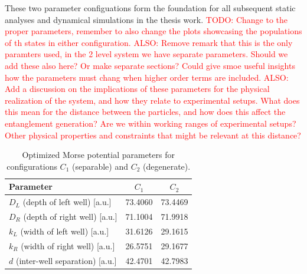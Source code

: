 \documentclass{subfiles}
\begin{document}
These two parameter configuations form the foundation for all subsequent static analyses and dynamical simulations in the thesis work. \textcolor{red}{TODO: Change to the proper parameters, remember to also change the plots showcasing the populations of th states in either configuration. ALSO: Remove remark that this is the only paramters used, in the 2 level system we have separate parameters. Should we add these also here? Or make separate sections? Could give smoe useful insights how the parameters must chang when higher order terms are included. ALSO: Add a discussion on the implications of these parameters for the physical realization of the system, and how they relate to experimental setups. What does this mean for the distance between the particles, and how does this affect the entanglement generation? Are we within working ranges of experimental setups? Other physical properties and constraints that might be relevant at this distance?}
\begin{table}[h!]
  \centering
  \caption{Optimized Morse potential parameters for configurations \(C_1\) (separable) and \(C_2\) (degenerate).}
  \label{tab:optimized_params}
  \begin{tabular}{lcc}
    \toprule
    Parameter & \(C_1\) & \(C_2\) \\
    \midrule
    \(D_L\) (depth of left well)       [a.u.] & 73.4060 & 73.4469 \\
    \(D_R\) (depth of right well)      [a.u.] & 71.1004 & 71.9918 \\
    \(k_L\) (width of left well)       [a.u.] & 31.6126 & 29.1615 \\
    \(k_R\) (width of right well)      [a.u.] & 26.5751 & 29.1677 \\
    \(d\)   (inter-well separation)     [a.u.] & 42.4701 & 42.7983 \\
    \bottomrule
  \end{tabular}
\end{table}
\end{document}
